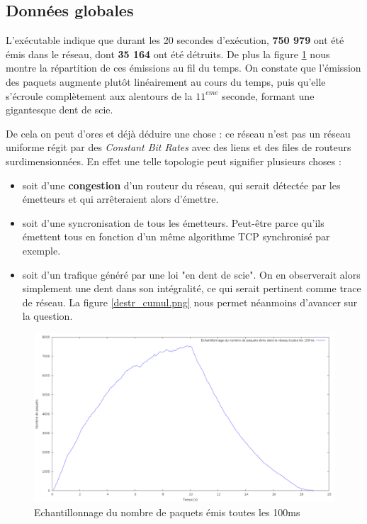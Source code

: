 \documentclass[
10pt, %
a4paper, %
oneside, %
headinclude,footinclude, %
BCOR5mm, %
]{scrartcl}
\begin{document}
\subsection{Données globales}
L'exécutable indique que durant les 20 secondes d'exécution, \textbf{750 979} ont été émis dans le réseau, dont \textbf{35 164} ont été détruits. De plus la figure \ref{total_packets} nous montre la répartition de ces émissions au fil du temps. On constate que l'émission des paquets augmente plutôt linéairement au cours du temps, puis qu'elle s'écroule complètement aux alentours de la $11^{eme} $ seconde, formant une gigantesque dent de scie.

De cela on peut d'ores et déjà déduire une chose : ce réseau n'est pas un réseau uniforme régit par des \textit{Constant Bit Rates} avec des liens et des files de routeurs surdimensionnées. En effet une telle topologie peut signifier plusieurs choses : 
\begin{itemize}
\item{soit d'une \textbf{congestion} d'un routeur du réseau, qui serait détectée par les émetteurs et qui arrêteraient alors d'émettre.}
\item{soit d'une syncronisation de tous les émetteurs. Peut-être parce qu'ils émettent tous en fonction d'un même algorithme TCP synchronisé par exemple.}
\item{soit d'un trafique généré par une loi "en dent de scie". On en observerait alors simplement une dent dans son intégralité, ce qui serait pertinent comme trace de réseau.}
La figure \ref{destr_cumul.png} nous permet néanmoins d'avancer sur la question.
\end{itemize}
\begin{figure}
	\centerfloat
    \includegraphics[width=19cm]{png/total_packets.png}
	\caption{Echantillonnage du nombre de paquets émis toutes les 100ms}
   \label{total_packets}
\end{figure}
\end{document}

